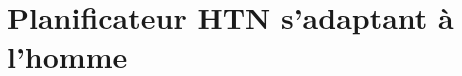 \documentclass[a4paper,11pt,twoside]{StyleThese}
\begin{document}





\section{Planificateur HTN s'adaptant à l'homme}
\label{sec:planning}

\end{document}
